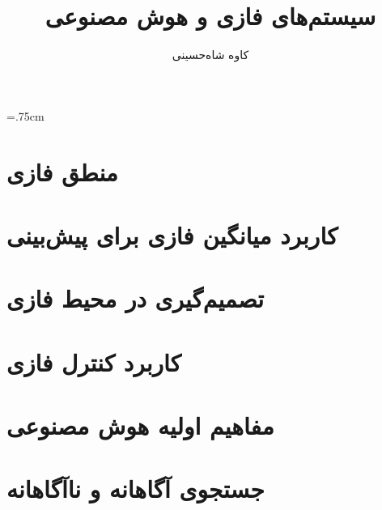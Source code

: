 \documentclass[12pt,a4paper]{article}
\title{‌سیستم‌های فازی و هوش مصنوعی}
\author{کاوه شاه‌حسینی}
\theoremstyle{definition}
\begin{document}

\newpage
\baselineskip=1cm
\tableofcontents
\newpage
\listoftables
\listoffigures
\baselineskip=.75cm
\newpage 

\section{منطق فازی}
\section{کاربرد میانگین فازی برای پیش‌بینی}
\section{تصمیم‌گیری در محیط فازی}
\section{کاربرد کنترل فازی}
\section{مفاهیم اولیه هوش مصنوعی}
\section{جستجوی آگاهانه و ناآگاهانه}
\newpage
\begin{latin}
{
	\small
	\setlength{\itemsep}{-2ex}
	\renewcommand{\refname}{\rl{{مراجع}\hfill}}
	
}
\end{latin}
\end{document}
